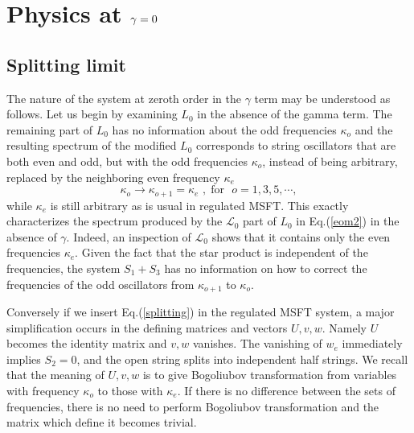 \documentclass[a4paper,aps,preprint,nofootinbib,eqsecnum]{revtex4}
\begin{document}
\section{Physics at $\protect\gamma=0$}

\subsection{Splitting limit}

The nature of the system at zeroth order in the $\gamma $ term may be
understood as follows. Let us begin by examining $L_{0}$ in the absence of
the gamma term.
The remaining part of $L_{0}$ has no information about the odd frequencies $%
\kappa _{o}$ and the resulting spectrum of the modified $L_{0}$ corresponds
to string oscillators that are both even and odd, but with the odd
frequencies $\kappa _{o}$, instead of being arbitrary, replaced by the
neighboring even frequency $\kappa _{e}$%
\begin{equation}
\kappa _{o}\rightarrow \kappa _{o+1}=\kappa _{e}\,\,,\;\mbox{for  }%
\,\,o=1,3,5,\cdots ,  \label{splitting}
\end{equation}%
while $\kappa _{e}$ is still arbitrary as is usual in regulated MSFT.
This exactly characterizes the spectrum produced by the $\mathcal{L}_{0}$
part of $L_{0}$ in Eq.(\ref{eom2}) in the absence of $\gamma $. Indeed, an
inspection of $\mathcal{L}_{0}$ shows that it contains only the even
frequencies $\kappa _{e}.$ Given the fact that the star product is
independent of the frequencies, the system $S_{1}+S_{3}$ has no information
on how to correct the frequencies of the odd oscillators from $\kappa _{o+1}$
to $\kappa _{o}.$

Conversely if we insert Eq.(\ref{splitting}) in the regulated MSFT system, a
major simplification occurs in the defining matrices and vectors $U,v,w$.
Namely $U$ becomes the identity matrix and $v,w$ vanishes. The vanishing of $%
w_{e}$ immediately implies $S_{2}=0$, and the open string splits into
independent half strings. We recall that the meaning of $U,v,w$ is to give
Bogoliubov transformation from variables with frequency $\kappa_o$ to those
with $\kappa_e$. If there is no difference between the sets of frequencies,
there is no need to perform Bogoliubov transformation and the matrix which
define it becomes trivial.
\end{document}
